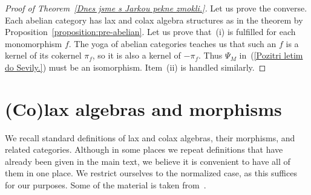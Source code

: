 \documentclass[12pt,leqno]{amsart}
\theoremstyle{definition}
\newcommand{\4}{\texttt{4}}
\begin{document}
\begin{proof}[Proof of Theorem~\ref{Dnes jsme s Jarkou pekne zmokli.}]
Let us prove the converse.
Each abelian category has lax and colax algebra
structures as in the theorem by Proposition~\ref{proposition:pre-abelian}.
Let us prove that~(i) is fulfilled for each monomorphism $f$. The
yoga of abelian categories teaches us that such an $f$ is a kernel of
its cokernel $\pi_f$, so it is also a kernel of $-\pi_f$. Thus
$\Psi_M$ in~(\ref{Pozitri letim do Sevily.}) must be an
isomorphism. Item~(ii) is handled similarly.   
\end{proof}

\appendix

\section{(Co)lax algebras and morphisms}
\label{Druhy den v Brne.}
 
We recall standard definitions of lax and colax algebras, their
morphisms, and related categories. Although in some places we repeat
definitions that have already been given in the main text, we believe
it is convenient to have all of them in one place. 
We restrict ourselves to the normalized
case, as this suffices for our purposes. Some of the material is taken
from~\cite{monads}.
\end{document}
